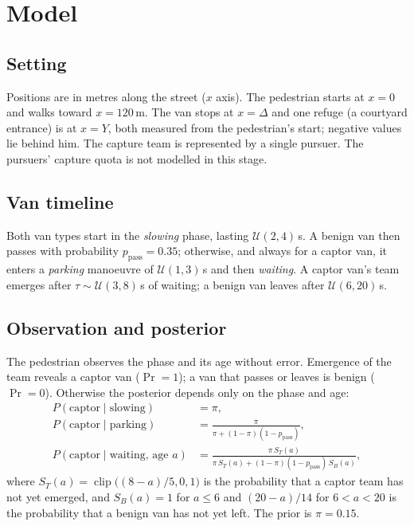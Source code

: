 \documentclass[11pt,a4paper]{article}
\begin{document}
\section{Model}\label{sec:model}

\subsection{Setting}
Positions are in metres along the street ($x$ axis). The pedestrian starts at $x=0$ and walks toward $x=120$\,m. The van stops at $x=\Delta$ and one refuge (a courtyard entrance) is at $x=Y$, both measured from the pedestrian's start; negative values lie behind him. The capture team is represented by a single pursuer. The pursuers' capture quota is not modelled in this stage.

\subsection{Van timeline}
Both van types start in the \emph{slowing} phase, lasting $\mathcal{U}(2,4)$\,s. A benign van then passes with probability $p_{\mathrm{pass}}=0.35$; otherwise, and always for a captor van, it enters a \emph{parking} manoeuvre of $\mathcal{U}(1,3)$\,s and then \emph{waiting}. A captor van's team emerges after $\tau\sim\mathcal{U}(3,8)$\,s of waiting; a benign van leaves after $\mathcal{U}(6,20)$\,s.

\subsection{Observation and posterior}
The pedestrian observes the phase and its age without error. Emergence of the team reveals a captor van ($\Pr=1$); a van that passes or leaves is benign ($\Pr=0$). Otherwise the posterior depends only on the phase and age:
\begin{align}
  P(\text{captor}\mid\text{slowing}) &= \pi, \label{eq:p1}\\
  P(\text{captor}\mid\text{parking}) &= \frac{\pi}{\pi+(1-\pi)(1-p_{\mathrm{pass}})}, \label{eq:p2}\\
  P(\text{captor}\mid\text{waiting, age }a) &= \frac{\pi\,S_T(a)}{\pi\,S_T(a)+(1-\pi)(1-p_{\mathrm{pass}})\,S_B(a)}, \label{eq:p3}
\end{align}
where $S_T(a)=\operatorname{clip}\!\bigl((8-a)/5,0,1\bigr)$ is the probability that a captor team has not yet emerged, and $S_B(a)=1$ for $a\le6$ and $(20-a)/14$ for $6<a<20$ is the probability that a benign van has not yet left. The prior is $\pi=0.15$.
\end{document}
